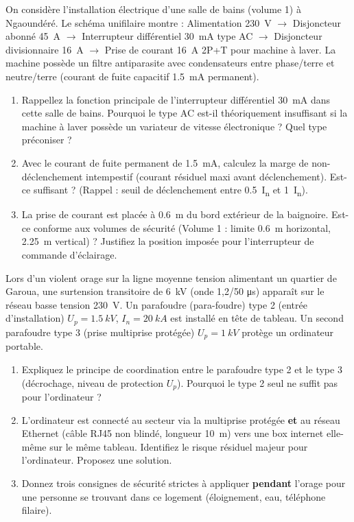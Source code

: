 \documentclass[11pt]{article}
\begin{document}
\begin{exercice}
On considère l'installation électrique d'une salle de bains (volume 1) à Ngaoundéré. Le schéma unifilaire montre : Alimentation \SI{230}{V} $\to$ Disjoncteur abonné \SI{45}{A} $\to$ Interrupteur différentiel \SI{30}{mA} type AC $\to$ Disjoncteur divisionnaire \SI{16}{A} $\to$ Prise de courant \SI{16}{A} 2P+T pour machine à laver. La machine possède un filtre antiparasite avec condensateurs entre phase/terre et neutre/terre (courant de fuite capacitif \SI{1,5}{mA} permanent).
\begin{enumerate}
    \item[2 pts] Rappellez la fonction principale de l'interrupteur différentiel \SI{30}{mA} dans cette salle de bains. Pourquoi le type AC est-il théoriquement insuffisant si la machine à laver possède un variateur de vitesse électronique ? Quel type préconiser ?
    \item[2 pts] Avec le courant de fuite permanent de \SI{1,5}{mA}, calculez la marge de non-déclenchement intempestif (courant résiduel maxi avant déclenchement). Est-ce suffisant ? (Rappel : seuil de déclenchement entre \SI{0,5}{I_{\Delta n}} et \SI{1}{I_{\Delta n}}).
    \item[2 pts] La prise de courant est placée à \SI{0,6}{m} du bord extérieur de la baignoire. Est-ce conforme aux volumes de sécurité (Volume 1 : limite \SI{0,6}{m} horizontal, \SI{2,25}{m} vertical) ? Justifiez la position imposée pour l'interrupteur de commande d'éclairage.
\end{enumerate}
\end{exercice}

\begin{exercice}
Lors d'un violent orage sur la ligne moyenne tension alimentant un quartier de Garoua, une surtension transitoire de \SI{6}{kV} (onde 1,2/50 \si{\micro s}) apparaît sur le réseau basse tension \SI{230}{V}. Un parafoudre (para-foudre) type 2 (entrée d'installation) $U_p = \SI{1,5}{kV}$, $I_n = \SI{20}{kA}$ est installé en tête de tableau. Un second parafoudre type 3 (prise multiprise protégée) $U_p = \SI{1}{kV}$ protège un ordinateur portable.
\begin{enumerate}
    \item[2 pts] Expliquez le principe de coordination entre le parafoudre type 2 et le type 3 (décrochage, niveau de protection $U_p$). Pourquoi le type 2 seul ne suffit pas pour l'ordinateur ?
    \item[2 pts] L'ordinateur est connecté au secteur via la multiprise protégée \textbf{et} au réseau Ethernet (câble RJ45 non blindé, longueur \SI{10}{m}) vers une box internet elle-même sur le même tableau. Identifiez le risque résiduel majeur pour l'ordinateur. Proposez une solution.
    \item[2 pts] Donnez trois consignes de sécurité strictes à appliquer \textbf{pendant} l'orage pour une personne se trouvant dans ce logement (éloignement, eau, téléphone filaire).
\end{enumerate}
\end{exercice}
\end{document}
